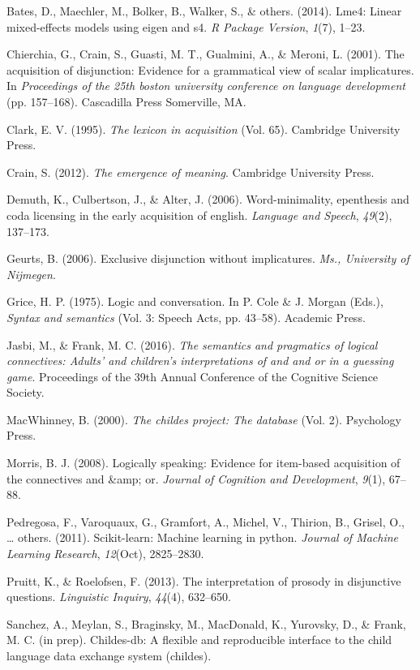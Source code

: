 \documentclass[10pt, letterpaper]{article}
\begin{document}
\hypertarget{ref-bates2014lme4}{}
Bates, D., Maechler, M., Bolker, B., Walker, S., \& others. (2014).
Lme4: Linear mixed-effects models using eigen and s4. \emph{R Package
Version}, \emph{1}(7), 1--23.

\hypertarget{ref-chierchia2001acquisition}{}
Chierchia, G., Crain, S., Guasti, M. T., Gualmini, A., \& Meroni, L.
(2001). The acquisition of disjunction: Evidence for a grammatical view
of scalar implicatures. In \emph{Proceedings of the 25th boston
university conference on language development} (pp. 157--168).
Cascadilla Press Somerville, MA.

\hypertarget{ref-clark1995lexicon}{}
Clark, E. V. (1995). \emph{The lexicon in acquisition} (Vol. 65).
Cambridge University Press.

\hypertarget{ref-crain2012emergence}{}
Crain, S. (2012). \emph{The emergence of meaning}. Cambridge University
Press.

\hypertarget{ref-demuth2006word}{}
Demuth, K., Culbertson, J., \& Alter, J. (2006). Word-minimality,
epenthesis and coda licensing in the early acquisition of english.
\emph{Language and Speech}, \emph{49}(2), 137--173.

\hypertarget{ref-geurts2006exclusive}{}
Geurts, B. (2006). Exclusive disjunction without implicatures.
\emph{Ms., University of Nijmegen}.

\hypertarget{ref-grice1975logicconvo}{}
Grice, H. P. (1975). Logic and conversation. In P. Cole \& J. Morgan
(Eds.), \emph{Syntax and semantics} (Vol. 3: Speech Acts, pp. 43--58).
Academic Press.

\hypertarget{ref-jasbi2016cogsci}{}
Jasbi, M., \& Frank, M. C. (2016). \emph{The semantics and pragmatics of
logical connectives: Adults' and children's interpretations of and and
or in a guessing game}. Proceedings of the 39th Annual Conference of the
Cognitive Science Society.

\hypertarget{ref-macwhinney2000childes}{}
MacWhinney, B. (2000). \emph{The childes project: The database} (Vol.
2). Psychology Press.

\hypertarget{ref-morris2008logically}{}
Morris, B. J. (2008). Logically speaking: Evidence for item-based
acquisition of the connectives and \&amp; or. \emph{Journal of Cognition
and Development}, \emph{9}(1), 67--88.

\hypertarget{ref-pedregosa2011scikit}{}
Pedregosa, F., Varoquaux, G., Gramfort, A., Michel, V., Thirion, B.,
Grisel, O., \ldots{} others. (2011). Scikit-learn: Machine learning in
python. \emph{Journal of Machine Learning Research}, \emph{12}(Oct),
2825--2830.

\hypertarget{ref-pruitt2013interpretation}{}
Pruitt, K., \& Roelofsen, F. (2013). The interpretation of prosody in
disjunctive questions. \emph{Linguistic Inquiry}, \emph{44}(4),
632--650.

\hypertarget{ref-childesdb}{}
Sanchez, A., Meylan, S., Braginsky, M., MacDonald, K., Yurovsky, D., \&
Frank, M. C. (in prep). Childes-db: A flexible and reproducible
interface to the child language data exchange system (childes).
\end{document}
